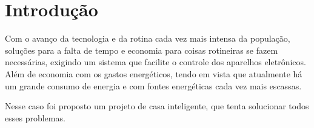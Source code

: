 \chapter{Introdução}
\par Com o avanço da tecnologia e da rotina cada vez mais intensa da população, soluções para a falta de tempo e economia para coisas rotineiras se fazem necessárias, exigindo um sistema que facilite o controle dos aparelhos eletrônicos. Além de economia com os gastos energéticos, tendo em vista que atualmente há um grande consumo de energia e com fontes energéticas cada vez mais escassas.
\par Nesse caso foi proposto um projeto de casa inteligente, que tenta solucionar todos esses problemas.
